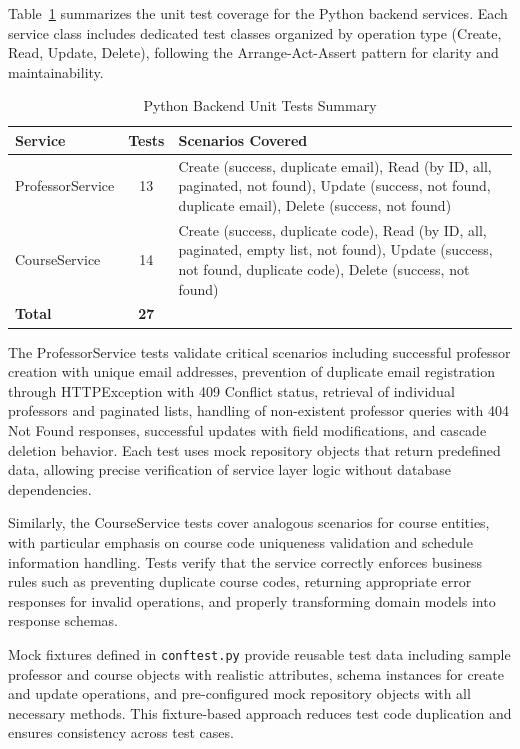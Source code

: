 \documentclass[12pt,a4paper]{article}
\begin{document}
Table~\ref{tab:pytest_unit_tests} summarizes the unit test coverage for the Python backend services. Each service class includes dedicated test classes organized by operation type (Create, Read, Update, Delete), following the Arrange-Act-Assert pattern for clarity and maintainability.\newline

\begin{table}[htbp]
	\centering
	\caption{Python Backend Unit Tests Summary}
	\label{tab:pytest_unit_tests}
	\begin{tabular}{@{}lcp{5.5cm}@{}}
		\toprule
		\textbf{Service} & \textbf{Tests} & \textbf{Scenarios Covered} \\ 
		\midrule
		ProfessorService & 13 & Create (success, duplicate email), Read (by ID, all, paginated, not found), Update (success, not found, duplicate email), Delete (success, not found) \\
		CourseService & 14 & Create (success, duplicate code), Read (by ID, all, paginated, empty list, not found), Update (success, not found, duplicate code), Delete (success, not found) \\
		\midrule
		\textbf{Total} & \textbf{27} & \\
		\bottomrule
	\end{tabular}
\end{table}

The ProfessorService tests validate critical scenarios including successful professor creation with unique email addresses, prevention of duplicate email registration through HTTPException with 409 Conflict status, retrieval of individual professors and paginated lists, handling of non-existent professor queries with 404 Not Found responses, successful updates with field modifications, and cascade deletion behavior. Each test uses mock repository objects that return predefined data, allowing precise verification of service layer logic without database dependencies.\newline

Similarly, the CourseService tests cover analogous scenarios for course entities, with particular emphasis on course code uniqueness validation and schedule information handling. Tests verify that the service correctly enforces business rules such as preventing duplicate course codes, returning appropriate error responses for invalid operations, and properly transforming domain models into response schemas.\newline

Mock fixtures defined in \texttt{conftest.py} provide reusable test data including sample professor and course objects with realistic attributes, schema instances for create and update operations, and pre-configured mock repository objects with all necessary methods. This fixture-based approach reduces test code duplication and ensures consistency across test cases.
\end{document}
